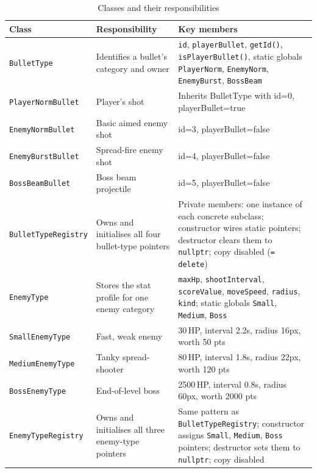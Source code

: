 \documentclass[11pt]{article}
\begin{document}
\begin{table}[htbp]
    \centering
    \caption{Classes and their responsibilities}
    \label{tab:classes}
    \renewcommand{\arraystretch}{1.2}
    \small
    \begin{tabular}{|l|p{3.2cm}|p{5.8cm}|}
        \hline
        \textbf{Class} & \textbf{Responsibility} & \textbf{Key members} \\
        \hline
        \texttt{BulletType} & Identifies a bullet's category and owner & \texttt{id}, \texttt{playerBullet}, \texttt{getId()}, \texttt{isPlayerBullet()}, static globals \texttt{PlayerNorm}, \texttt{EnemyNorm}, \texttt{EnemyBurst}, \texttt{BossBeam}\\
        \hline
        \texttt{PlayerNormBullet} & Player's shot& Inherits BulletType with id=0, playerBullet=true \\
        \hline
        \texttt{EnemyNormBullet} & Basic aimed enemy shot & id=3, playerBullet=false \\
        \hline
        \texttt{EnemyBurstBullet} & Spread-fire enemy shot & id=4, playerBullet=false \\
        \hline
        \texttt{BossBeamBullet} & Boss beam projectile & id=5, playerBullet=false \\
        \hline
        \texttt{BulletTypeRegistry} & Owns and initialises all four bullet-type pointers& Private members: one instance of each concrete subclass; constructor wires static pointers; destructor clears them to \texttt{nullptr}; copy disabled (\texttt{= delete}) \\
        \hline
        \texttt{EnemyType} & Stores the stat profile for one enemy category & \texttt{maxHp}, \texttt{shootInterval}, \texttt{scoreValue}, \texttt{moveSpeed}, \texttt{radius}, \texttt{kind}; static globals \texttt{Small}, \texttt{Medium}, \texttt{Boss}\\
        \hline
        \texttt{SmallEnemyType} & Fast, weak enemy & 30\,HP, interval 2.2s, radius 16px, worth 50 pts \\
        \hline
        \texttt{MediumEnemyType} & Tanky spread-shooter & 80\,HP, interval 1.8s, radius 22px, worth 120 pts \\
        \hline
        \texttt{BossEnemyType} & End-of-level boss & 2500\,HP, interval 0.8s, radius 60px, worth 2000 pts \\
        \hline
        \texttt{EnemyTypeRegistry} & Owns and initialises all three enemy-type pointers& Same pattern as \texttt{BulletTypeRegistry}; constructor assigns \texttt{Small}, \texttt{Medium}, \texttt{Boss} pointers; destructor sets them to \texttt{nullptr}; copy disabled\\

\end{tabular}
\end{table}
\end{document}
